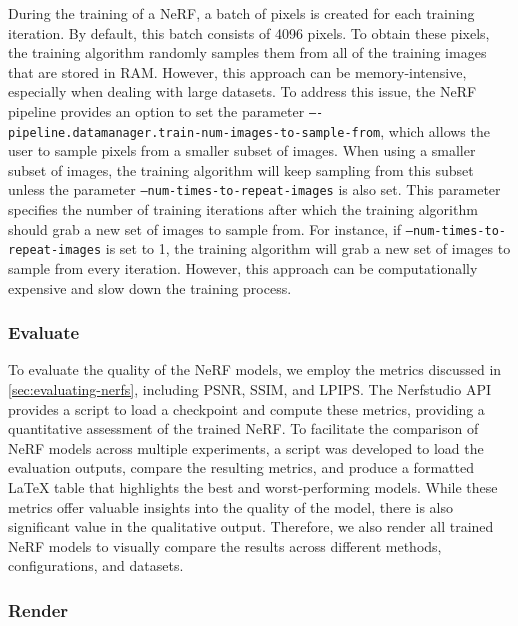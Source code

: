 During the training of a NeRF, a batch of pixels is created for each training iteration. By default, this batch consists of 4096 pixels. To obtain these pixels, the training algorithm randomly samples them from all of the training images that are stored in RAM. However, this approach can be memory-intensive, especially when dealing with large datasets. To address this issue, the NeRF pipeline provides an option to set the parameter \texttt{–-pipeline.datamanager.train-num-images-to-sample-from}, which allows the user to sample pixels from a smaller subset of images. When using a smaller subset of images, the training algorithm will keep sampling from this subset unless the parameter \texttt{--num-times-to-repeat-images} is also set. This parameter specifies the number of training iterations after which the training algorithm should grab a new set of images to sample from. For instance, if \texttt{--num-times-to-repeat-images} is set to 1, the training algorithm will grab a new set of images to sample from every iteration. However, this approach can be computationally expensive and slow down the training process.

\subsubsection{Evaluate}

To evaluate the quality of the NeRF models, we employ the metrics discussed in \autoref{sec:evaluating-nerfs}, including PSNR, SSIM, and LPIPS. The Nerfstudio API provides a script to load a checkpoint and compute these metrics, providing a quantitative assessment of the trained NeRF. To facilitate the comparison of NeRF models across multiple experiments, a script was developed to load the evaluation outputs, compare the resulting metrics, and produce a formatted LaTeX table that highlights the best and worst-performing models. While these metrics offer valuable insights into the quality of the model, there is also significant value in the qualitative output. Therefore, we also render all trained NeRF models to visually compare the results across different methods, configurations, and datasets.



\subsubsection{Render}

